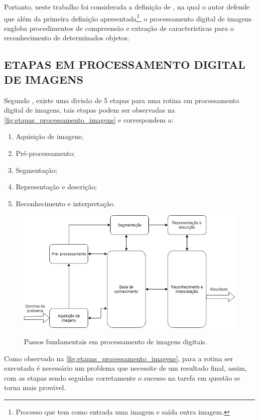 \par Portanto, neste trabalho foi considerada a definição de , na qual o autor defende que além da primeira definição apresentada\footnote{Processo que tem como entrada uma imagem e saída outra imagem.}, o processamento digital de imagens engloba procedimentos de compreensão e extração de características para o reconhecimento de determinados objetos.

\subsection{ETAPAS EM PROCESSAMENTO DIGITAL DE IMAGENS}
\label{subsec:etapas}
Segundo , existe uma divisão de 5 etapas para uma rotina em processamento digital de imagens, tais etapas podem ser observadas na \autoref{fig:etapas_processamento_imagens} e correspondem a:
\begin{enumerate}
    \item Aquisição de imagens;
    \item Pré-processamento;
    \item Segmentação;
    \item Representação e descrição;
    \item Reconhecimento e interpretação.
\end{enumerate}

\begin{figure}[!h]
    \centering
    \caption{Passos fundamentais em processamento de imagens digitais.}
    \includegraphics[width=1\textwidth]{./dados/figuras/etapas_processamento_imagens.png}
    \label{fig:etapas_processamento_imagens}
\end{figure}

\par Como observado na \autoref{fig:etapas_processamento_imagens}, para a rotina ser executada é necessário um problema que necessite de um resultado final, assim, com as etapas sendo seguidas corretamente o sucesso na tarefa em questão se torna mais provável. 

